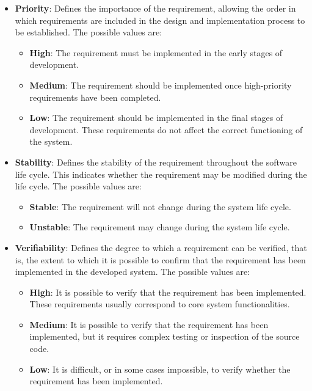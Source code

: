 \begin{itemize}
    \item \textbf{Priority}: Defines the importance of the requirement, allowing the order in which requirements are included in the design and implementation process to be established. The possible values are:
          \begin{itemize}
              \item \textbf{High}: The requirement must be implemented in the early stages of development.
              \item \textbf{Medium}: The requirement should be implemented once high-priority requirements have been completed.
              \item \textbf{Low}: The requirement should be implemented in the final stages of development. These requirements do not affect the correct functioning of the system.
          \end{itemize}

    \item \textbf{Stability}: Defines the stability of the requirement throughout the software life cycle. This indicates whether the requirement may be modified during the life cycle. The possible values are:
          \begin{itemize}
              \item \textbf{Stable}: The requirement will not change during the system life cycle.
              \item \textbf{Unstable}: The requirement may change during the system life cycle.
          \end{itemize}

    \item \textbf{Verifiability}: Defines the degree to which a requirement can be verified, that is, the extent to which it is possible to confirm that the requirement has been implemented in the developed system. The possible values are:
          \begin{itemize}
              \item \textbf{High}: It is possible to verify that the requirement has been implemented. These requirements usually correspond to core system functionalities.
              \item \textbf{Medium}: It is possible to verify that the requirement has been implemented, but it requires complex testing or inspection of the source code.
              \item \textbf{Low}: It is difficult, or in some cases impossible, to verify whether the requirement has been implemented.
          \end{itemize}
\end{itemize}

